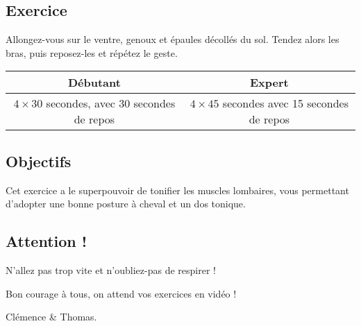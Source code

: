 \documentclass[12pt,a4paper]{article}
\subtitle{Fiche \no 2 -- Superman}
\begin{document}
\maketitle




\subsection*{Exercice}
	Allongez-vous sur le ventre, genoux et épaules décollés du sol. Tendez alors les bras, puis reposez-les et répétez le geste.

	\begin{center}
		\begin{tabular}{c|c}
			\textbf{Débutant} & \textbf{Expert} \\
			\hline
			$4\times 30$ secondes, avec 30 secondes de repos & $4\times45$ secondes avec 15 secondes de repos \\
		\end{tabular}
	\end{center}

\subsection*{Objectifs}
	Cet exercice a le superpouvoir de tonifier les muscles lombaires, vous permettant d'adopter une bonne posture à cheval et un dos tonique.

\subsection*{Attention !}
	N'allez pas trop vite et n'oubliez-pas de respirer !

\vfill
\begin{flushright}
	Bon courage à tous, on attend vos exercices en vidéo ! \phantom{Clémence et Thomas}

	Clémence \& Thomas.
\end{flushright}
\end{document}

